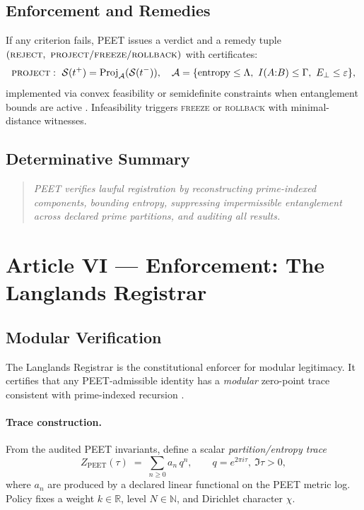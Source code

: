 \documentclass[12pt]{amsart}
\theoremstyle{plain}
\begin{document}
\subsection{Enforcement and Remedies}

If any criterion fails, PEET issues a verdict and a remedy tuple $(\textsc{reject},\ \textsc{project}/\textsc{freeze}/\textsc{rollback})$ with certificates:
\[
\textsc{project}:\ \mathcal{S}(t^+)=\operatorname{Proj}_{\mathcal{A}}(\mathcal{S}(t^-)),\quad
\mathcal{A}=\{\text{entropy}\le\Lambda,\ I(A{:}B)\le\Gamma,\ E_\perp\le\varepsilon\},
\]
implemented via convex feasibility or semidefinite constraints when entanglement bounds are active \cite{boyd2004convex}. Infeasibility triggers \textsc{freeze} or \textsc{rollback} with minimal-distance witnesses.

\subsection{Determinative Summary}

\begin{quote}
\textit{PEET verifies lawful registration by reconstructing prime-indexed components, bounding entropy, suppressing impermissible entanglement across declared prime partitions, and auditing all results.}
\end{quote}


\section{Article VI — Enforcement: The Langlands Registrar}

\subsection{Modular Verification}

The Langlands Registrar is the constitutional enforcer for modular legitimacy. It certifies that any PEET-admissible identity has a \emph{modular} zero-point trace consistent with prime-indexed recursion \cite{vanGelder2025pirtm}.

\paragraph{Trace construction.}
From the audited PEET invariants, define a scalar \emph{partition/entropy trace}
\[
Z_{\mathrm{PEET}}(\tau)\;=\;\sum_{n\ge 0} a_n\,q^n,\qquad q=e^{2\pi i\tau},\ \Im\tau>0,
\]
where $a_n$ are produced by a declared linear functional on the PEET metric log. Policy fixes a weight $k\in\mathbb{R}$, level $N\in\mathbb{N}$, and Dirichlet character $\chi$.
\end{document}
